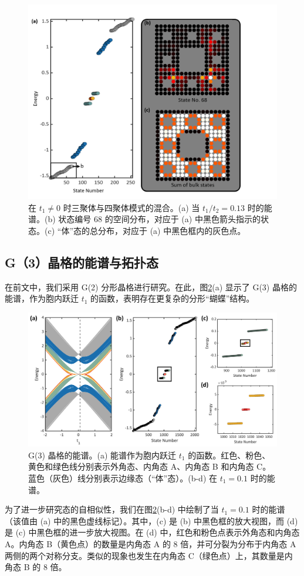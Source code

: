 \begin{figure}[htbp]
    \centering
    \includegraphics[width=0.6\linewidth]{figure/HOTITheo/MixElem.png}
    \caption{在 \( t_1 \neq 0 \) 时三聚体与四聚体模式的混合。(a) 当 \( t_1/t_2=0.13 \) 时的能谱。(b) 状态编号 68 的空间分布，对应于 (a) 中黑色箭头指示的状态。(c) “体”态的总分布，对应于 (a) 中黑色框内的灰色点。}
    \label{fig:MixElem}
\end{figure}

\subsection{G（3）晶格的能谱与拓扑态}
在前文中，我们采用 G(2) 分形晶格进行研究。在此，图\ref{fig:G2Spec}(a) 显示了 G(3) 晶格的能谱，作为胞内跃迁 \( t_1 \) 的函数，表明存在更复杂的分形“蝴蝶”结构。

\begin{figure}[htbp]
    \centering
    \includegraphics[width=0.75\linewidth]{figure/HOTITheo/G2Spec.png}
    \caption{G(3) 晶格的能谱。(a) 能谱作为胞内跃迁 \( t_1 \) 的函数。红色、粉色、黄色和绿色线分别表示外角态、内角态 A、内角态 B 和内角态 C。蓝色（灰色）线分别表示边缘态（“体”态）。(b-d) 在 \( t_1=0.1 \) 时的能谱。}
    \label{fig:G2Spec}
\end{figure}

为了进一步研究态的自相似性，我们在图\ref{fig:G2Spec}(b-d) 中绘制了当 \( t_1=0.1 \) 时的能谱（该值由 (a) 中的黑色虚线标记）。其中，(c) 是 (b) 中黑色框的放大视图，而 (d) 是 (c) 中黑色框的进一步放大视图。在 (d) 中，红色和粉色点表示外角态和内角态 A。内角态 B（黄色点）的数量是内角态 A 的 8 倍，并可分裂为分布于内角态 A 两侧的两个对称分支。类似的现象也发生在内角态 C（绿色点）上，其数量是内角态 B 的 8 倍。

